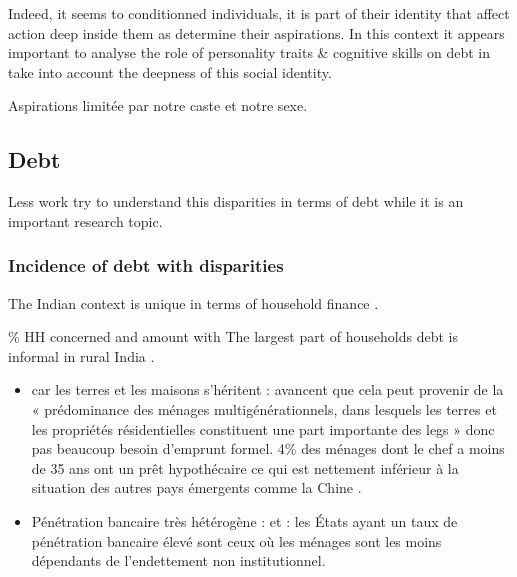 \documentclass[a4paper, 11pt, onecolumn]{article}
\begin{document}
Indeed, it seems to conditionned individuals, it is part of their identity that affect action deep inside them as determine their aspirations.
In this context it appears important to analyse the role of personality traits \& cognitive skills on debt in take into account the deepness of this social identity.


Aspirations limitée par notre caste et notre sexe.



	\subsection{Debt}
	
Less work try to understand this disparities in terms of debt while it is an important research topic.
		
		\subsubsection{Incidence of debt with disparities}

The Indian context is unique in terms of household finance \citep{Badarinza2016b}.

\% HH concerned and amount with \cite{NSSO2014}
The largest part of households debt is informal in rural India \citep{Badarinza2016b}.
\begin{itemize}
\item car les terres et les maisons s'héritent : \citep{Badarinza2016b} avancent que cela peut provenir de la « prédominance des ménages multigénérationnels, dans lesquels les terres et les propriétés résidentielles constituent une part importante des legs » donc pas beaucoup besoin d'emprunt formel. 4\% des ménages dont le chef a moins de 35 ans ont un prêt hypothécaire ce qui est nettement inférieur à la situation des autres pays émergents comme la Chine \citep{Badarinza2016b}.
\item Pénétration bancaire très hétérogène : \citep{Badarinza2016b} et \citep{Burgess2005} : les États ayant un taux de pénétration bancaire élevé sont ceux où les ménages sont les moins dépendants de l’endettement non institutionnel.
\end{itemize}
\end{document}
